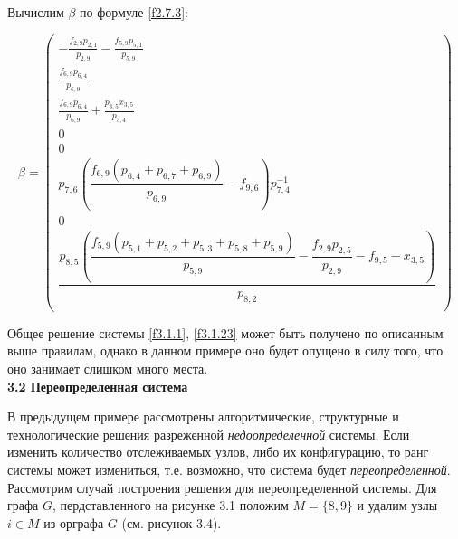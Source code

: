 \documentclass[14pt]{extarticle}%
\begin{document}
Вычислим $\beta$ по формуле \eqref{f2.7.3}:

\begin{equation}
	\beta=\left(
\begin{array}{c}
 -\frac{f_{2,9} p_{2,1}}{p_{2,9}}-\frac{f_{5,9} p_{5,1}}{p_{5,9}} \\
 \frac{f_{6,9} p_{6,4}}{p_{6,9}} \\
 \frac{f_{6,9} p_{6,4}}{p_{6,9}}+\frac{p_{3,5} x_{3,5}}{p_{3,4}} \\
 0 \\
 0 \\
p_{7,6} \left(\dfrac{f_{6,9} \left(p_{6,4}+p_{6,7}+p_{6,9}\right)}{p_{6,9}}-f_{9,6}\right)p_{7,4}^{-1} \\
 0 \\
 \dfrac{p_{8,5} \left(\dfrac{f_{5,9} \left(p_{5,1}+p_{5,2}+p_{5,3}+p_{5,8}+p_{5,9}\right)}{p_{5,9}}-\dfrac{f_{2,9} p_{2,5}}{p_{2,9}}-f_{9,5}-x_{3,5}\right)}{p_{8,2}} \\
\end{array}
\right)
\end{equation}

Общее решение системы \eqref{f3.1.1}, \eqref{f3.1.23} может быть получено по описанным выше правилам, однако в данном примере оно будет опущено в силу того, что оно занимает слишком много места.
\\

\textbf{3.2 Переопределенная система}

В предыдущем примере рассмотрены алгоритмические, структурные и технологические решения разреженной {\it недоопределенной} системы. Если изменить количество отслеживаемых узлов, либо их конфигурацию, то ранг системы может измениться, т.е. возможно, что система будет {\it переопределенной}. Рассмотрим случай построения решения для переопределенной системы. Для графа $G$, пердставленного на рисунке 3.1 положим $M=\{8,9\}$ и удалим узлы $i\in M$ из орграфа $G$ (см. рисунок 3.4).
\end{document}
